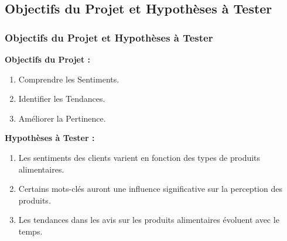\subsection{Objectifs du Projet et Hypothèses à Tester}

\begin{frame}
    \frametitle{Objectifs du Projet et Hypothèses à Tester}

    \textbf{Objectifs du Projet :}

    \begin{enumerate}
        \item Comprendre les Sentiments.
        \item Identifier les Tendances.
        \item Améliorer la Pertinence.
    \end{enumerate}

    \textbf{Hypothèses à Tester :}

    \begin{enumerate}
        \item Les sentiments des clients varient en fonction des types de produits alimentaires.
        \item Certains mots-clés auront une influence significative sur la perception des produits.
        \item Les tendances dans les avis sur les produits alimentaires évoluent avec le temps.
    \end{enumerate}
\end{frame}